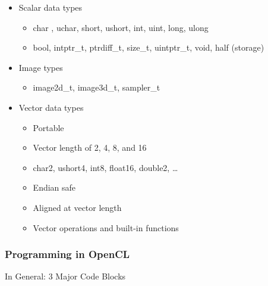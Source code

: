 \begin{itemize}
\tightlist
\item
  Scalar data types

  \begin{itemize}
  \tightlist
  \item
    char , uchar, short, ushort, int, uint, long, ulong
  \item
    bool, intptr\_t, ptrdiff\_t, size\_t, uintptr\_t, void, half
    (storage)
  \end{itemize}
\item
  Image types

  \begin{itemize}
  \tightlist
  \item
    image2d\_t, image3d\_t, sampler\_t
  \end{itemize}
\item
  Vector data types

  \begin{itemize}
  \tightlist
  \item
    Portable
  \item
    Vector length of 2, 4, 8, and 16
  \item
    char2, ushort4, int8, float16, double2, \ldots{}
  \item
    Endian safe
  \item
    Aligned at vector length
  \item
    Vector operations and built-in functions
  \end{itemize}
\end{itemize}

\clearpage
\hypertarget{programming-in-opencl}{%
\subsubsection{Programming in OpenCL}\label{programming-in-opencl}}

In General: 3 Major Code Blocks

